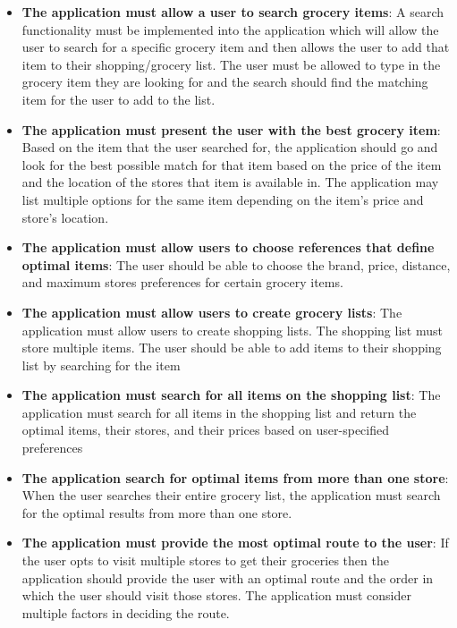 \begin{itemize}
\item \textbf{The application must allow a user to search grocery items}: A search functionality must be implemented into the application which will allow the user to search for a specific grocery item and then allows the user to add that item to their shopping/grocery list. The user must be allowed to type in the grocery item they are looking for and the search should find the matching item for the user to add to the list.

\item \textbf{The application must present the user with the best grocery item}: Based on the item that the user searched for, the application should go and look for the best possible match for that item based on the price of the item and the location of the stores that item is available in. The application may list multiple options for the same item depending on the item's price and store's location.

\item \textbf{The application must allow users to choose references that define optimal items}: The user should be able to choose the brand, price, distance, and maximum stores preferences for certain grocery items.

\item \textbf{The application must allow users to create grocery lists}: The application must allow users to create shopping lists. The shopping list must store multiple items. The user should be able to add items to their shopping list by searching for the item

\item \textbf{The application must search for all items on the shopping list}: The application must search for all items in the shopping list and return the optimal items, their stores, and their prices based on user-specified preferences

\item \textbf{The application search for optimal items from more than one store}: When the user searches their entire grocery list, the application must search for the optimal results from more than one store.

\item \textbf{The application must provide the most optimal route to the user}: If the user opts to visit multiple stores to get their groceries then the application should provide the user with an optimal route and the order in which the user should visit those stores. The application must consider multiple factors in deciding the route.


\end{itemize}
